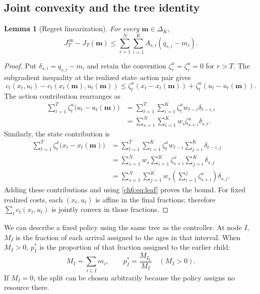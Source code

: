 \documentclass[11pt]{article}
\theoremstyle{plain}
\newtheorem{Thm:Lemma}[Thm:Theorem]{Lemma}
\theoremstyle{remark}
\numberwithin{equation}{section}
\begin{document}
\subsection{Joint convexity and the tree identity}
\begin{Thm:Lemma}[Regret linearization]\label{ch6:lem:joint}
For every $\mathbf m\in\Delta_K$,
\begin{equation}\label{ch6:eq:joint-compare}
 J_T^{\mathrm{on}}-J_T(\mathbf m)
 \le\sum_{s=1}^N\sum_{i=1}^KA_{s,i}(q_{s,i}-m_i).
\end{equation}
\end{Thm:Lemma}
\begin{proof}
Put $\delta_{s,i}=q_{s,i}-m_i$ and retain the convention
$\zeta_r^x=\zeta_r^u=0$ for $r>T$.  The subgradient inequality at the
realized state--action pair gives
\[
c_t(x_t,u_t)-c_t(x_t(\mathbf m),u_t(\mathbf m))
\le\zeta_t^x(x_t-x_t(\mathbf m))
+\zeta_t^u(u_t-u_t(\mathbf m)).
\]
The action contribution rearranges as
\begin{align*}
\sum_{t=1}^{T}\zeta_t^u\bigl(u_t-u_t(\mathbf m)\bigr)
&=\sum_{t=1}^{T}\sum_{i=1}^{K}
  \zeta_t^uw_{t-i}\delta_{t-i,i}\\
&=\sum_{s=1}^{N}\sum_{i=1}^{K}
  w_s\zeta_{s+i}^u\delta_{s,i}.
\end{align*}
Similarly, the state contribution is
\begin{align*}
\sum_{t=1}^{T}\zeta_t^x\bigl(x_t-x_t(\mathbf m)\bigr)
&=\sum_{t=1}^{T}\sum_{i=1}^{K}
  \zeta_t^xw_{t-i}\sum_{j=i}^{K}\delta_{t-i,j}\\
&=\sum_{s=1}^{N}w_s\sum_{i=1}^{K}
  \zeta_{s+i}^x\sum_{j=i}^{K}\delta_{s,j}\\
&=\sum_{s=1}^{N}\sum_{j=1}^{K}
  w_s\left(\sum_{i=1}^{j}\zeta_{s+i}^x\right)\delta_{s,j}.
\end{align*}
Adding these contributions and using \eqref{ch6:eq:leaf} proves the bound.
For fixed realized costs, each $(x_t,u_t)$ is affine in the final fractions;
therefore $\sum_t c_t(x_t,u_t)$ is jointly convex in those fractions.
\end{proof}

We can describe a fixed policy using the same tree as the controller.
At node $I$, $M_I$ is the fraction of each arrival assigned to the ages
in that interval. When $M_I>0$, $p_I^*$ is the proportion of that
fraction assigned to the earlier child:
\begin{equation}\label{ch6:eq:comparator-mass}
 M_I=\sum_{i\in I}m_i,\qquad
 p_I^*=\frac{M_{I_{\mathrm{L}}}}{M_I}\quad(M_I>0).
\end{equation}
If $M_I=0$, the split can be chosen arbitrarily because the policy assigns
no resource there.
\end{document}
